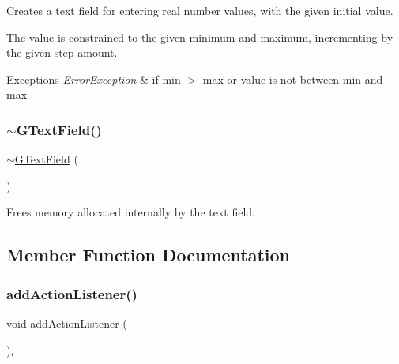 Creates a text field for entering real number values, with the given initial value. 

The value is constrained to the given minimum and maximum, incrementing by the given step amount. 
\begin{DoxyExceptions}{Exceptions}
{\em Error\+Exception} & if min $>$ max or value is not between min and max \\
\hline
\end{DoxyExceptions}
\mbox{\label{classGTextField_a3361f8538c9bd9337a7ccc533d3534c0}} 
\subsubsection{\texorpdfstring{$\sim$\+G\+Text\+Field()}{~GTextField()}}
{\footnotesize\ttfamily $\sim$\mbox{\hyperlink{classGTextField}{G\+Text\+Field}} (\begin{DoxyParamCaption}{ }\end{DoxyParamCaption})\hspace{0.3cm}{\ttfamily [override]}}



Frees memory allocated internally by the text field. 



\subsection{Member Function Documentation}
\mbox{\label{classGInteractor_a02f20ea6edfa0671f31c4c648a253833}} 
\subsubsection{\texorpdfstring{add\+Action\+Listener()}{addActionListener()}}
{\footnotesize\ttfamily void add\+Action\+Listener (\begin{DoxyParamCaption}{ }\end{DoxyParamCaption})\hspace{0.3cm}{\ttfamily [virtual]}, {\ttfamily [inherited]}}



